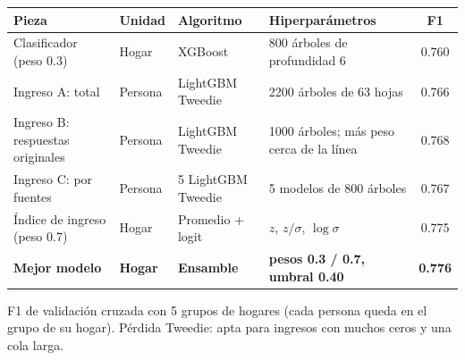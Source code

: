 
\begin{threeparttable}
\begin{tabular}[t]{llllc}
\toprule
Pieza & Unidad & Algoritmo & Hiperparámetros & F1\\
\midrule
Clasificador (peso 0.3) & Hogar & XGBoost & 800 árboles de profundidad 6 & 0.760\\
Ingreso A: total & Persona & LightGBM Tweedie & 2200 árboles de 63 hojas & 0.766\\
Ingreso B: respuestas originales & Persona & LightGBM Tweedie & 1000 árboles; más peso cerca de la línea & 0.768\\
Ingreso C: por fuentes & Persona & 5 LightGBM Tweedie & 5 modelos de 800 árboles & 0.767\\
Índice de ingreso (peso 0.7) & Hogar & Promedio + logit & $z$, $z/\sigma$, $\log\sigma$ & 0.775\\
\midrule
\textbf{\textbf{Mejor modelo}} & \textbf{Hogar} & \textbf{Ensamble} & \textbf{pesos 0.3 / 0.7, umbral 0.40} & \textbf{0.776}\\
\bottomrule
\end{tabular}
\begin{tablenotes}
\item F1 de validación cruzada con 5 grupos de hogares (cada persona queda en el grupo de su hogar). Pérdida Tweedie: apta para ingresos con muchos ceros y una cola larga.
\end{tablenotes}
\end{threeparttable}
